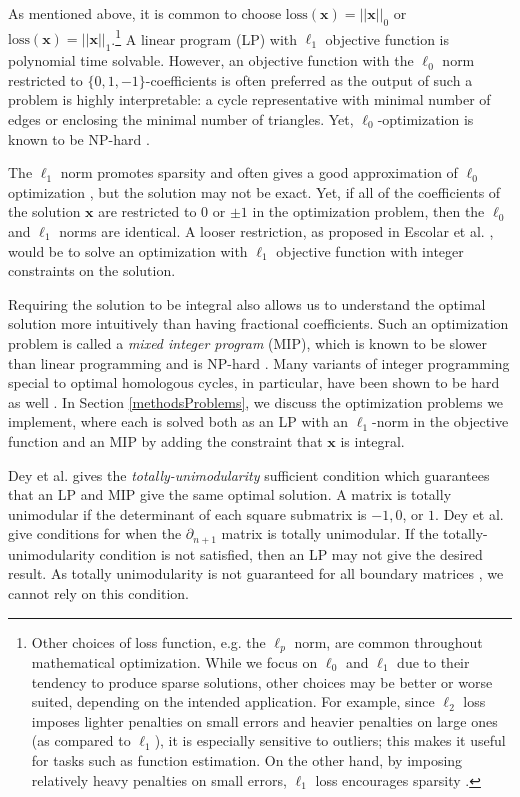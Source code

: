 \documentclass[11pt,onecolumn]{article}
\newcommand{\optimalrep}{\mathbf{x}}
\newcommand{\se}{Section }
\newcommand{\loss}{\mathrm{loss}}
\theoremstyle{plain}
\theoremstyle{definition}
\begin{document}
As mentioned above, it is common to choose $\loss(\optimalrep) = ||\optimalrep||_0$ or $\loss(\optimalrep) = ||\optimalrep||_1$.\footnote{Other choices of loss function, e.g. the $\ell_p$ norm, are common throughout mathematical optimization.  While we focus on $\ell_0$ and $\ell_1$ due to their tendency to produce sparse solutions, other choices may be better or worse suited, depending on the intended application.  For example, since $\ell_2$ loss  imposes lighter penalties on small errors and heavier penalties on large ones (as compared to $\ell_1$), it is especially sensitive to outliers; this makes it useful for tasks such as function estimation.  On the other hand, by imposing relatively heavy penalties on small errors, $\ell_1$ loss encourages sparsity \cite{dohono,NPhardL0}.} A linear program (LP) with $\ell_1$ objective function is polynomial time solvable. However, an objective function with the $\ell_0$ norm restricted to $\{0,1,-1\}$-coefficients is often preferred as the output of such a problem is highly interpretable: a cycle representative with minimal number of edges or enclosing the minimal number of triangles. Yet, $\ell_0$-optimization is known to be NP-hard \cite{NPhardL0}. 


The  $\ell_1$ norm promotes sparsity and often gives a good approximation of $\ell_0$ optimization \cite{dohono,NPhardL0}, but the solution may not be exact. Yet, if all of the coefficients of the solution $\optimalrep$ are restricted to $0$ or $\pm 1$ in the optimization problem, then the $\ell_0$ and $\ell_1$ norms are identical. A looser restriction, as proposed in Escolar et al. \cite{Escolar2016}, would be to solve an optimization with $\ell_1$ objective function with integer constraints on the solution. 


Requiring the solution to be integral also allows us to understand the optimal solution more intuitively than having fractional coefficients. Such an optimization problem is called a \textit{mixed integer program} (MIP), which is known to be slower than linear programming and is NP-hard \cite{Obayashi2018}. Many variants of integer programming special to optimal homologous cycles, in particular, have been shown to be hard as well \cite{borradaile2020minimum}. In \se \ref{methodsProblems}, we discuss the optimization problems we implement, where each is solved both as an LP with an $\ell_1$-norm in the objective function and an MIP by adding the constraint that $\optimalrep$ is integral. 

Dey et al. \cite{dey2011optimal} gives the \textit{totally-unimodularity} sufficient condition which guarantees that an LP and MIP give the same optimal solution. A matrix is totally unimodular if the determinant of each square submatrix is $-1, 0$, or $1$. Dey et al. \cite{dey2011optimal} give conditions for when the $\partial_{n+1}$ matrix is totally unimodular. If the totally-unimodularity condition is not satisfied, then an LP may not give the desired result. As totally unimodularity is not guaranteed for all boundary matrices \cite{henselman2014combinatorial}, we cannot rely on this condition. 
\end{document}
